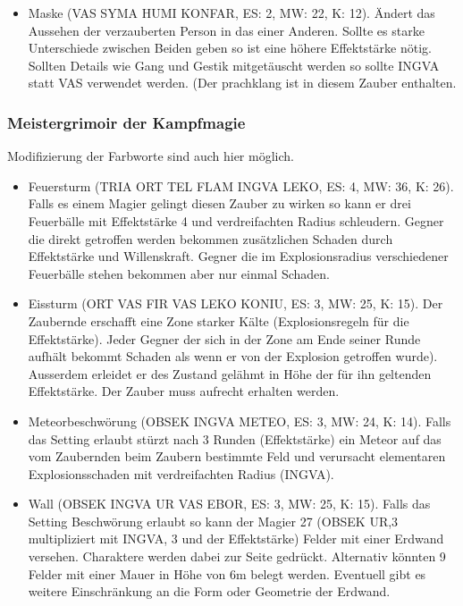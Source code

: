 \documentclass{article}
\begin{document}
\begin{itemize}
\item Maske (VAS SYMA HUMI KONFAR, ES: 2, MW: 22, K: 12). Ändert das Aussehen der verzauberten Person in das einer Anderen. Sollte es starke Unterschiede zwischen Beiden geben so ist eine höhere Effektstärke nötig. Sollten Details wie Gang und Gestik mitgetäuscht werden so sollte INGVA statt VAS verwendet werden. (Der prachklang ist in diesem Zauber enthalten.
\end{itemize}

\subsubsection{Meistergrimoir der Kampfmagie}

Modifizierung der Farbworte sind auch hier möglich.

\begin{itemize}
\item Feuersturm (TRIA ORT TEL FLAM INGVA LEKO, ES: 4, MW: 36, K: 26). Falls es einem Magier gelingt diesen Zauber zu wirken so kann er drei Feuerbälle mit Effektstärke 4 und verdreifachten Radius schleudern. Gegner die direkt getroffen werden bekommen zusätzlichen Schaden durch Effektstärke und Willenskraft. Gegner die im Explosionsradius verschiedener Feuerbälle stehen bekommen aber nur einmal Schaden.
\end{itemize}

\begin{itemize}
\item Eissturm (ORT VAS FIR VAS LEKO KONIU, ES: 3, MW: 25, K: 15). Der Zaubernde erschafft eine Zone starker Kälte (Explosionsregeln für die Effektstärke). Jeder Gegner der sich in der Zone am Ende seiner Runde aufhält bekommt Schaden als wenn er von der Explosion getroffen wurde). Ausserdem erleidet er des Zustand gelähmt in Höhe der für ihn geltenden Effektstärke. Der Zauber muss aufrecht erhalten werden.
\end{itemize}

\begin{itemize}
\item Meteorbeschwörung (OBSEK INGVA METEO, ES: 3, MW: 24, K: 14). Falls das Setting erlaubt stürzt nach 3 Runden (Effektstärke) ein Meteor auf das vom Zaubernden beim Zaubern bestimmte Feld und verursacht elementaren Explosionsschaden mit verdreifachten Radius (INGVA).
\end{itemize}

\begin{itemize}
\item Wall (OBSEK INGVA UR VAS EBOR, ES: 3, MW: 25, K: 15). Falls das Setting Beschwörung erlaubt so kann der Magier 27 (OBSEK UR,3 multipliziert mit INGVA, 3 und der Effektstärke) Felder mit einer Erdwand versehen. Charaktere werden dabei zur Seite gedrückt. Alternativ könnten 9 Felder mit einer Mauer in Höhe von 6m belegt werden. Eventuell gibt es weitere Einschränkung an die Form oder Geometrie der Erdwand.
\end{itemize}
\end{document}
